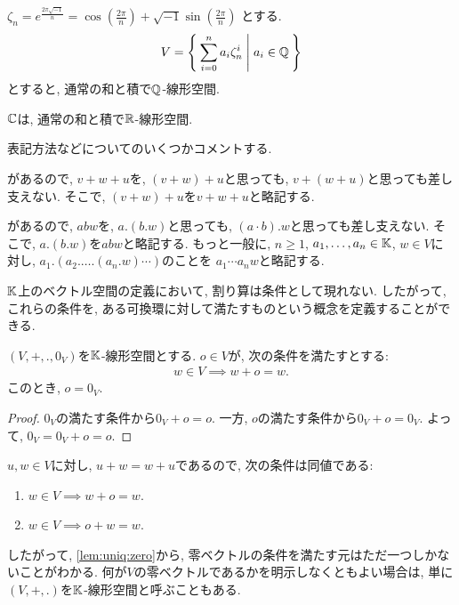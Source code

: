 \begin{example}
  $\zeta_n= e^{\frac{2\pi\sqrt{-1}}{n}}=\cos(\frac{2\pi}{n})+\sqrt{-1}\sin(\frac{2\pi}{n})$
  とする.
  \begin{align*}
    V=\Set{\sum_{i=0}^{n}a_i\zeta_n^i|a_i\in\mathbb{Q}}
  \end{align*}
  とすると,
  通常の和と積で$\mathbb{Q}$-線形空間.
\end{example}

\begin{example}
  $\mathbb{C}$は,
  通常の和と積で$\mathbb{R}$-線形空間.
\end{example}



表記方法などについてのいくつかコメントする.
\begin{remark}
があるので, $v+w+u$を, $(v+w)+u$と思っても,
$v+(w+u)$と思っても差し支えない.
そこで, $(v+w)+u$を$v+w+u$と略記する.
\end{remark}
\begin{remark}
があるので, $abw$を, $a.(b.w)$と思っても,
$(a\cdot b).w$と思っても差し支えない.
そこで, $a.(b.w)$を$abw$と略記する.
もっと一般に, $n\geq 1$, $a_1,\ldots, a_n\in\mathbb{K}$, $w\in V$に対し,
$a_1.(a_2.\ldots.(a_n.w)\cdots)$のことを
$a_1\cdots a_n w$と略記する.
\end{remark}
\begin{remark}
  $\mathbb{K}$上のベクトル空間の定義において,
  割り算は条件として現れない.
  したがって,
  これらの条件を, ある可換環に対して満たすものという概念を定義することができる.
\end{remark}
\begin{prop}
  \label{lem:uniq:zero}
  $(V,+,.,0_V)$を$\mathbb{K}$-線形空間とする.
  $o\in V$が, 次の条件を満たすとする:
  \begin{align*}
    w\in V \implies w+o=w.
  \end{align*}
  このとき, $o=0_V$.
\end{prop}
\begin{proof}
  $0_V$の満たす条件から$0_V+o=o$.
  一方, $o$の満たす条件から$0_V+o=0_V$.
  よって, $0_V=0_V+o=o$.
\end{proof}
\begin{remark}
  $u,w\in V$に対し, $u+w=w+u$であるので,
  次の条件は同値である:
  \begin{enumerate}
  \item $w\in V \implies w+o=w$.
  \item $w\in V \implies o+w=w$.
  \end{enumerate}
  したがって, \cref{lem:uniq:zero}から,
  零ベクトルの条件を満たす元はただ一つしかないことがわかる.
  何が$V$の零ベクトルであるかを明示しなくともよい場合は,
  単に$(V,+,.)$を$\mathbb{K}$-線形空間と呼ぶこともある.
\end{remark}
